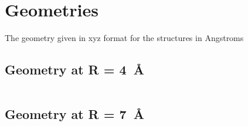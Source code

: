 \section{Geometries}
The geometry given in xyz format for the  structures in Angstroms
\subsection{Geometry at R = \SI{4}{\angstrom}}
\inputminted{md}{parts/water4_4A.xyz}
\subsection{Geometry at R = \SI{7}{\angstrom}}
\inputminted{md}{parts/water4_7A.xyz}
\newpage
